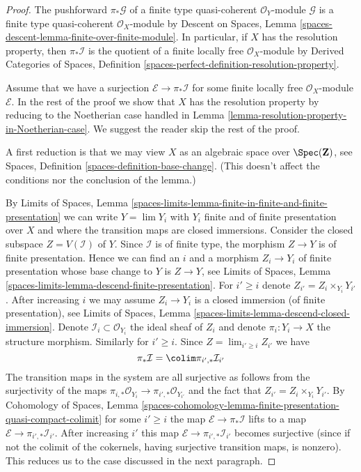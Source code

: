 \begin{proof}
The pushforward $\pi_*\mathcal{G}$ of a finite type
quasi-coherent $\mathcal{O}_Y$-module $\mathcal{G}$ is a finite
type quasi-coherent $\mathcal{O}_X$-module by
Descent on Spaces, Lemma
\ref{spaces-descent-lemma-finite-over-finite-module}.
In particular, if $X$ has the resolution property, then $\pi_*\mathcal{I}$
is the quotient of a finite locally free $\mathcal{O}_X$-module by
Derived Categories of Spaces, Definition
\ref{spaces-perfect-definition-resolution-property}.

\medskip\noindent
Assume that we have a surjection $\mathcal{E} \to \pi_*\mathcal{I}$
for some finite locally free $\mathcal{O}_X$-module $\mathcal{E}$.
In the rest of the proof we show that $X$ has the resolution property
by reducing to the Noetherian case handled in
Lemma \ref{lemma-resolution-property-in-Noetherian-case}.
We suggest the reader skip the rest of the proof.

\medskip\noindent
A first reduction is that we may view $X$ as an algebraic space over
$\Spec(\mathbf{Z})$, see
Spaces, Definition \ref{spaces-definition-base-change}.
(This doesn't affect the conditions nor the conclusion of the lemma.)

\medskip\noindent
By Limits of Spaces, Lemma
\ref{spaces-limits-lemma-finite-in-finite-and-finite-presentation}
we can write $Y = \lim Y_i$ with $Y_i$ finite and of finite
presentation over $X$ and where the transition maps are closed
immersions. Consider the closed subspace $Z = V(\mathcal{I})$ of $Y$.
Since $\mathcal{I}$ is of finite type, the morphism $Z \to Y$ is of
finite presentation. Hence we can find an $i$ and a morphism
$Z_i \to Y_i$ of finite presentation whose base change to $Y$
is $Z \to Y$, see Limits of Spaces, Lemma
\ref{spaces-limits-lemma-descend-finite-presentation}.
For $i' \geq i$ denote $Z_{i'} = Z_i \times_{Y_i} Y_{i'}$.
After increasing $i$ we may assume $Z_i \to Y_i$ is a
closed immersion (of finite presentation), see Limits of Spaces, Lemma
\ref{spaces-limits-lemma-descend-closed-immersion}. Denote
$\mathcal{I}_i \subset \mathcal{O}_{Y_i}$ the ideal
sheaf of $Z_i$ and denote $\pi_i : Y_i \to X$ the structure morphism.
Similarly for $i' \geq i$. Since $Z = \lim_{i' \geq i} Z_{i'}$ we have
$$
\pi_*\mathcal{I} = \colim \pi_{i', *}\mathcal{I}_{i'}
$$
The transition maps in the system are all surjective
as follows from the surjectivity of the maps
$\pi_{i, *}\mathcal{O}_{Y_i} \to \pi_{i', *}\mathcal{O}_{Y_{i'}}$
and the fact that $Z_{i'} = Z_i \times_{Y_i} Y_{i'}$.
By Cohomology of Spaces, Lemma
\ref{spaces-cohomology-lemma-finite-presentation-quasi-compact-colimit}
for some $i' \geq i$ the map $\mathcal{E} \to \pi_*\mathcal{I}$
lifts to a map $\mathcal{E} \to \pi_{i', *}\mathcal{I}_{i'}$.
After increasing $i'$ this map
$\mathcal{E} \to \pi_{i', *}\mathcal{I}_{i'}$
becomes surjective (since if not the colimit of the cokernels,
having surjective transition maps, is nonzero).
This reduces us to the case discussed in the next paragraph.


\end{proof}

